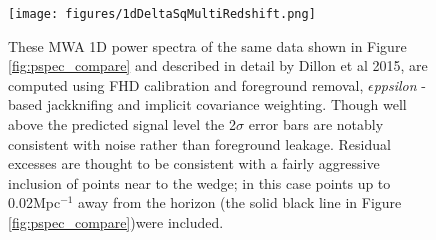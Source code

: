 \documentclass[preprint]{aastex}
\def\eppsilon{{\it $\epsilon$ppsilon }}
\def\dilloncite{Dillon et al 2015}
\begin{document}
\begin{figure}[h!]
\begin{center}
\texttt{[image: figures/1dDeltaSqMultiRedshift.png]}
\caption{These MWA 1D power spectra of the same data shown in Figure \ref{fig:pspec_compare} and described in detail by \dilloncite, are computed using FHD calibration and foreground removal, \eppsilon-based jackknifing and implicit covariance weighting. Though well above the predicted signal level the 2$\sigma$ error bars are notably consistent with noise rather than foreground leakage.   Residual excesses are thought to be consistent with a fairly aggressive inclusion of points near to the wedge; in this case points up to 0.02Mpc$^{-1}$ away from the horizon (the solid black line in Figure \ref{fig:pspec_compare})were included.\label{fig:1D_pspecs}}
\end{center}
\end{figure}
\end{document}
